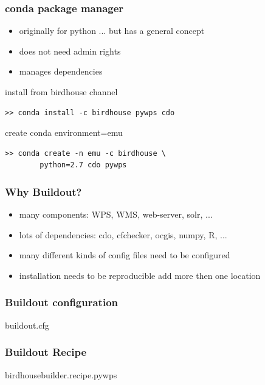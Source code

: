 \documentclass{beamer}
\begin{document}
  \begin{frame}[fragile]
    \frametitle{conda package manager}
    \begin{itemize}
      \item originally for python ... but has a general concept
      \item does not need admin rights
      \item manages dependencies
    \end{itemize}
    \begin{block}{install from birdhouse channel}
      \begin{lstlisting}
>> conda install -c birdhouse pywps cdo 
      \end{lstlisting}
    \end{block}
    \begin{block}{create conda environment=emu}
      \begin{lstlisting}
>> conda create -n emu -c birdhouse \
        python=2.7 cdo pywps 
      \end{lstlisting}
    \end{block}
\end{frame}

  \begin{frame}
    \frametitle{Why Buildout?}
    \begin{itemize}
      \item many components: WPS, WMS, web-server, solr, ...
      \item lots of dependencies: cdo, cfchecker, ocgis, numpy, R, ...
      \item many different kinds of config files need to be configured 
      \item installation needs to be reproducible add more then one location
    \end{itemize}
  \end{frame}

  \begin{frame}[shrink]
    \frametitle{Buildout configuration}
    \begin{block}{buildout.cfg}
      
    \end{block}
\end{frame}

  \begin{frame}[shrink]
    \frametitle{Buildout Recipe}
    \begin{block}{birdhousebuilder.recipe.pywps}
      
    \end{block}
\end{frame}
\end{document}
